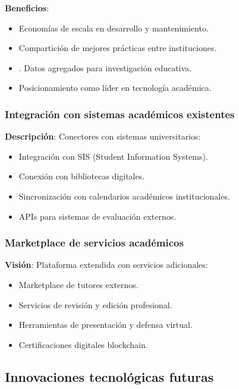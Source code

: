 \documentclass[12pt,a4paper,oneside]{report}
\providecommand{\tightlist}{%
  \setlength{\itemsep}{0pt}\setlength{\parskip}{0pt}}
\begin{document}
\textbf{Beneficios}:

\begin{itemize}
\tightlist
\item
  Economías de escala en desarrollo y mantenimiento.
\item
  Compartición de mejores prácticas entre instituciones.
\item.
  Datos agregados para investigación educativa.
\item
  Posicionamiento como líder en tecnología académica.
\end{itemize}

\subsubsection{Integración con sistemas académicos
existentes}\label{integraciuxf3n-con-sistemas-acaduxe9micos-existentes}

\textbf{Descripción}: Conectores con sistemas universitarios:

\begin{itemize}
\tightlist
\item
  Integración con SIS (Student Information Systems).
\item
  Conexión con bibliotecas digitales.
\item
  Sincronización con calendarios académicos institucionales.
\item
  APIs para sistemas de evaluación externos.
\end{itemize}

\subsubsection{Marketplace de servicios
académicos}\label{marketplace-de-servicios-acaduxe9micos}

\textbf{Visión}: Plataforma extendida con servicios adicionales:

\begin{itemize}
\tightlist
\item
  Marketplace de tutores externos.
\item
  Servicios de revisión y edición profesional.
\item
  Herramientas de presentación y defensa virtual.
\item
  Certificaciones digitales blockchain.
\end{itemize}

\subsection{Innovaciones tecnológicas
futuras}\label{innovaciones-tecnoluxf3gicas-futuras}
\end{document}
